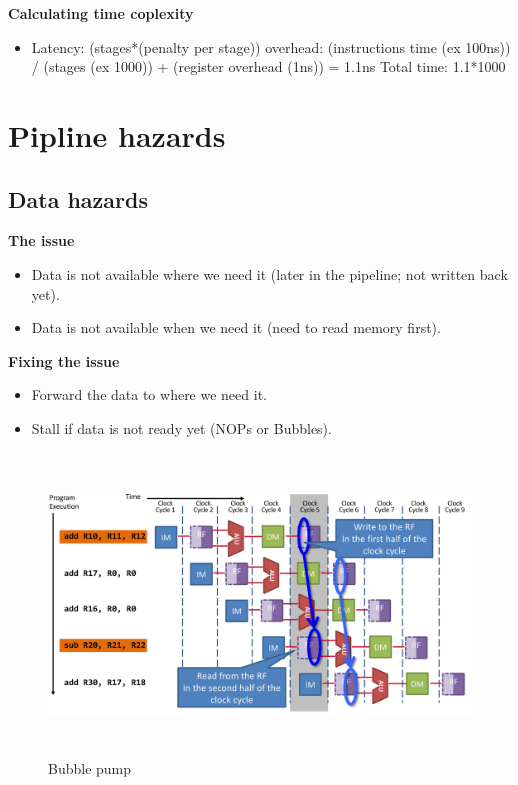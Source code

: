 \textbf{Calculating time coplexity}
\begin{itemize}
\item  Latency: (stages*(penalty per stage)) \newline
  overhead: (instructions time (ex 100ns)) / (stages (ex 1000)) + (register overhead (1ns)) = 1.1ns
  Total time: 1.1*1000
\end{itemize}


\newpage


\section{Pipline hazards}

\subsection{Data hazards}
\textbf{The issue}
\begin{itemize}
\item  Data is not available where we need it (later in the pipeline; not written back yet).
\item  Data is not available when we need it (need to read memory first).
\end{itemize}

\textbf{Fixing the issue}
\begin{itemize}
\item  Forward the data to where we need it.
\item  Stall if data is not ready yet (NOPs or Bubbles).
\end{itemize}

\begin{figure}[h]
    \vspace{10mm}
    \centering
    \includegraphics[width=16cm, height=8cm]{image/dubble-pump.png} 
    \caption{Bubble pump}
\end{figure}


